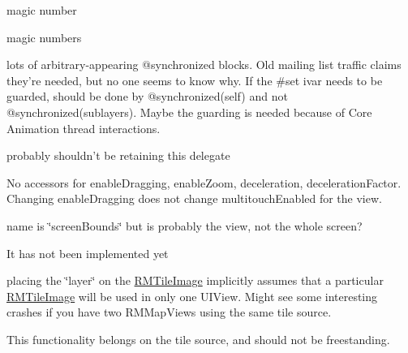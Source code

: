 \begin{DoxyRefList}
magic number  
\item[\label{bug__bug000009}%
\hypertarget{bug__bug000009}{}%
成员 \hyperlink{_r_m_lat_long_8h_a32ae83485fab5791a001f3b6afdda192}{k\-R\-M\-Min\-Latitude} ]magic numbers  
\item[\label{bug__bug000010}%
\hypertarget{bug__bug000010}{}%
类 \hyperlink{interface_r_m_layer_collection}{R\-M\-Layer\-Collection} ]lots of arbitrary-\/appearing @synchronized blocks. Old mailing list traffic claims they're needed, but no one seems to know why. If the \#set ivar needs to be guarded, should be done by @synchronized(self) and not @synchronized(sublayers). Maybe the guarding is needed because of Core Animation thread interactions.  
\item[\label{bug__bug000012}%
\hypertarget{bug__bug000012}{}%
成员 \hyperlink{interface_r_m_map_contents_a37fd1037d5c01ab7543a46056039ec77}{R\-M\-Map\-Contents\-:\-:tiles\-Update\-Delegate} ]probably shouldn't be retaining this delegate  
\item[\label{bug__bug000024}%
\hypertarget{bug__bug000024}{}%
类 \hyperlink{interface_r_m_map_view}{R\-M\-Map\-View} ]No accessors for enable\-Dragging, enable\-Zoom, deceleration, deceleration\-Factor. Changing enable\-Dragging does not change multitouch\-Enabled for the view.  
\item[\label{bug__bug000032}%
\hypertarget{bug__bug000032}{}%
成员 \hyperlink{interface_r_m_mercator_to_screen_projection_ac28d9acefc1c419405f7331d9038675a}{R\-M\-Mercator\-To\-Screen\-Projection\-:\-:screen\-Bounds} ]name is \char`\"{}screen\-Bounds\char`\"{} but is probably the view, not the whole screen?  
\item[\label{bug__bug000038}%
\hypertarget{bug__bug000038}{}%
文件 \hyperlink{_r_m_s_m_layer_info_8h}{R\-M\-S\-M\-Layer\-Info.h} ]It has not been implemented yet  
\item[\label{bug__bug000050}%
\hypertarget{bug__bug000050}{}%
成员 \hyperlink{interface_r_m_tile_image_aa83652d7c55218b6fae37c70280cca18}{R\-M\-Tile\-Image\-:\-:layer} ]placing the \char`\"{}layer\char`\"{} on the \hyperlink{interface_r_m_tile_image}{R\-M\-Tile\-Image} implicitly assumes that a particular \hyperlink{interface_r_m_tile_image}{R\-M\-Tile\-Image} will be used in only one U\-I\-View. Might see some interesting crashes if you have two R\-M\-Map\-Views using the same tile source.  
\item[\label{bug__bug000051}%
\hypertarget{bug__bug000051}{}%
类 \hyperlink{interface_r_m_tile_proxy}{R\-M\-Tile\-Proxy} ]This functionality belongs on the tile source, and should not be freestanding. 
\end{DoxyRefList}